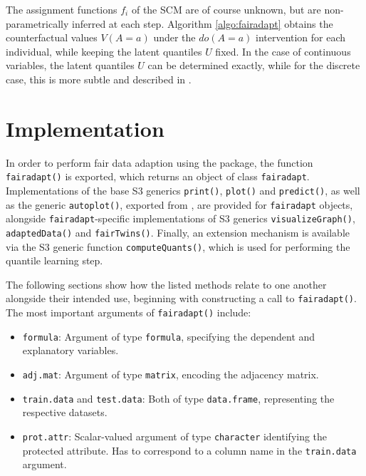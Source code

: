 \documentclass[
  nojss]{jss}
\providecommand{\tightlist}{%
  \setlength{\itemsep}{0pt}\setlength{\parskip}{0pt}}
\begin{document}
The assignment functions \(f_i\) of the SCM are of course unknown, but
are non-parametrically inferred at each step. Algorithm
\ref{algo:fairadapt} obtains the counterfactual values \(V(A = a)\)
under the \(do(A = a)\) intervention for each individual, while keeping
the latent quantiles \(U\) fixed. In the case of continuous variables,
the latent quantiles \(U\) can be determined exactly, while for the
discrete case, this is more subtle and described in
\citet[Section~5]{plecko2020fair}.

\hypertarget{implementation}{%
\section{Implementation}\label{implementation}}

In order to perform fair data adaption using the 
package, the function \texttt{fairadapt()} is exported, which returns an
object of class \texttt{fairadapt}. Implementations of the base
 S3 generics \texttt{print()}, \texttt{plot()} and
\texttt{predict()}, as well as the generic \texttt{autoplot()}, exported
from  \citep{wickham2016ggplot2}, are provided for
\texttt{fairadapt} objects, alongside \texttt{fairadapt}-specific
implementations of S3 generics \texttt{visualizeGraph()},
\texttt{adaptedData()} and \texttt{fairTwins()}. Finally, an extension
mechanism is available via the S3 generic function
\texttt{computeQuants()}, which is used for performing the quantile
learning step.

The following sections show how the listed methods relate to one another
alongside their intended use, beginning with constructing a call to
\texttt{fairadapt()}. The most important arguments of
\texttt{fairadapt()} include:

\begin{itemize}
\tightlist
\item
  \texttt{formula}: Argument of type \texttt{formula}, specifying the
  dependent and explanatory variables.
\item
  \texttt{adj.mat}: Argument of type \texttt{matrix}, encoding the
  adjacency matrix.
\item
  \texttt{train.data} and \texttt{test.data}: Both of type
  \texttt{data.frame}, representing the respective datasets.
\item
  \texttt{prot.attr}: Scalar-valued argument of type \texttt{character}
  identifying the protected attribute. Has to correspond to a column
  name in the \texttt{train.data} argument.
\end{itemize}
\end{document}
